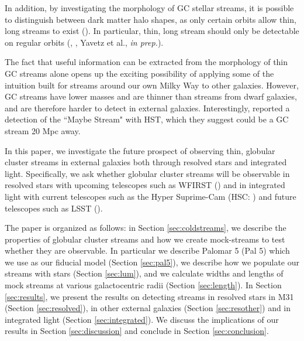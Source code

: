 \documentclass[twocolumn]{aastex62}
\begin{document}
In addition, by investigating the morphology of GC stellar streams, it is  possible to distinguish between dark matter halo shapes, as only certain orbits allow thin, long streams to exist (\citealt{pearson15}). In particular, thin, long stream should only be detectable on regular orbits (\citealt{pearson15}, \citealt{price16}, Yavetz et al., {\it in prep.}).

The fact that useful information can be extracted from the morphology of thin GC streams alone opens up the exciting possibility of applying some of the intuition built for streams around our own Milky Way to other galaxies. However, GC streams have lower masses and are thinner than streams from dwarf galaxies, and are therefore harder to detect in external galaxies. Interestingly, \citet{abraham18} reported a detection of the ``Maybe Stream" with HST, which they suggest could be a GC stream 20 Mpc away. 


In this paper, we investigate the future prospect of observing thin, globular cluster streams in external galaxies both through resolved stars and integrated light. 
Specifically, we ask whether globular cluster streams will be observable in resolved stars with upcoming telescopes such as WFIRST (\citealt{spergel13}) and in integrated light with current telescopes such as the Hyper Suprime-Cam (HSC: \citealt{miyazaki12}) and future telescopes such as LSST (\citealt{ivezi08}). %

The paper is organized as follows: in Section \ref{sec:coldstreams}, we describe the properties of globular cluster streams and how we create mock-streams to test whether they are observable. In particular we describe Palomar 5 (Pal 5) which we use as our fiducial model (Section \ref{sec:pal5}), we describe how we populate our streams with stars (Section \ref{sec:lum}), and we calculate widths and lengths of mock streams at various galactocentric radii (Section \ref{sec:length}). In Section \ref{sec:results}, we present the results on detecting streams in resolved stars in M31 (Section \ref{sec:resolved}), in other external galaxies (Section \ref{sec:resother}) and in integrated light (Section \ref{sec:integrated}). We discuss the implications of our results in Section \ref{sec:discussion} and conclude in Section \ref{sec:conclusion}.
%
\end{document}
